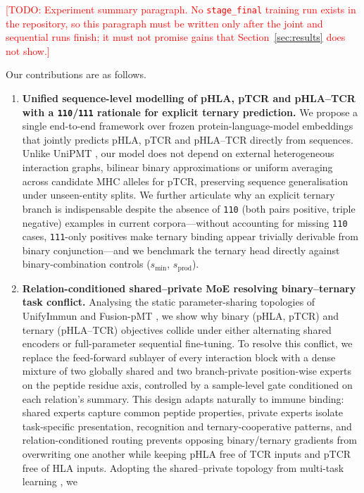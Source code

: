 \documentclass[webpdf,modern,large,namedate]{oup-authoring-template}
\theoremstyle{thmstyleone}
\theoremstyle{thmstyletwo}
\theoremstyle{thmstylethree}
\DeclareRobustCommand{\TODO}[1]{\textcolor{red}{[TODO: #1]}}
\newcommand{\PH}{pHLA}
\newcommand{\PT}{pTCR}
\newcommand{\PHT}{pHLA--TCR}
\begin{document}
\TODO{Experiment summary paragraph. No \texttt{stage\_final} training run
exists in the repository, so this paragraph must be written only after the
joint and sequential runs finish; it must not promise gains that
Section~\ref{sec:results} does not show.}

Our contributions are as follows.
\begin{enumerate}[1.]
\item \textbf{Unified sequence-level modelling of \PH{}, \PT{} and \PHT{} with
a \texttt{110}/\texttt{111} rationale for explicit ternary prediction.} We
propose a single end-to-end framework over frozen protein-language-model
embeddings that jointly predicts \PH{}, \PT{} and \PHT{} directly from
sequences. Unlike UniPMT \citep{zhao2025unipmt}, our model does not depend on
external heterogeneous interaction graphs, bilinear binary approximations or
uniform averaging across candidate MHC alleles for \PT{}, preserving sequence
generalisation under unseen-entity splits. We further articulate why an
explicit ternary branch is indispensable despite the absence of \texttt{110}
(both pairs positive, triple negative) examples in current corpora---without
accounting for missing \texttt{110} cases, \texttt{111}-only positives make
ternary binding appear trivially derivable from binary conjunction---and we
benchmark the ternary head directly against binary-combination controls
($s_{\min}$, $s_{\mathrm{prod}}$).
\item \textbf{Relation-conditioned shared--private MoE resolving
binary--ternary task conflict.} Analysing the static parameter-sharing
topologies of UnifyImmun \citep{yu2025unifyimmun} and Fusion-pMT
\citep{ma2025fusionpmt}, we show why binary (\PH{}, \PT{}) and ternary (\PHT{})
objectives collide under either alternating shared encoders or full-parameter
sequential fine-tuning. To resolve this conflict, we replace the feed-forward
sublayer of every interaction block with a dense mixture of two globally shared
and two branch-private position-wise experts on the peptide residue axis,
controlled by a sample-level gate conditioned on each relation's summary. This
design adapts naturally to immune binding: shared experts capture common
peptide properties, private experts isolate task-specific presentation,
recognition and ternary-cooperative patterns, and relation-conditioned routing
prevents opposing binary/ternary gradients from overwriting one another while
keeping \PH{} free of TCR inputs and \PT{} free of HLA inputs. Adopting the
shared--private topology from multi-task learning \citep{tang2020ple}, we

\end{enumerate}
\end{document}
